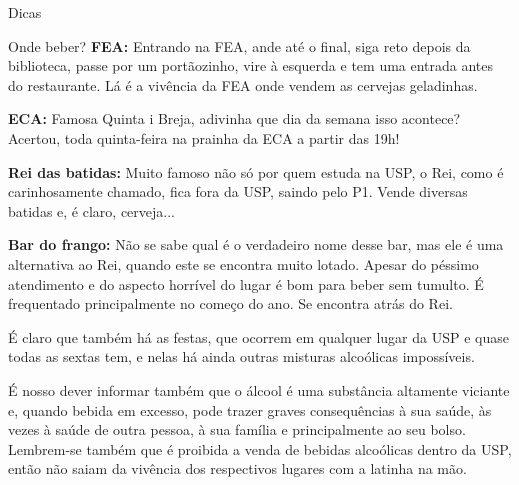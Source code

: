 \begin{secao}{Dicas}
\begin{subsecao}{Onde beber?}
{\bf FEA:} Entrando na FEA, ande até o final, siga reto depois da biblioteca,
passe por um portãozinho, vire à esquerda e tem uma entrada antes do restaurante.
Lá é a vivência da FEA onde vendem as cervejas geladinhas.

{\bf ECA:} Famosa Quinta i Breja, adivinha que dia da semana isso acontece?
Acertou, toda quinta-feira na prainha da ECA a partir das 19h!

{\bf Rei das batidas:} Muito famoso não só por quem estuda na USP, o Rei,
como é carinhosamente chamado, fica fora da USP, saindo pelo P1. Vende
diversas batidas e, é claro, cerveja...

{\bf Bar do frango:} Não se sabe qual é o verdadeiro nome desse bar, mas ele é
uma alternativa ao Rei, quando este se encontra muito lotado. Apesar do péssimo atendimento e do aspecto horrível do lugar é bom para beber sem
tumulto. É frequentado principalmente no começo do ano. Se encontra atrás do
Rei.

É claro que também há as festas, que ocorrem em qualquer lugar da USP e quase todas as sextas tem, e nelas
há ainda outras misturas alcoólicas impossíveis.

É nosso dever informar também que o álcool é uma substância altamente viciante
e, quando bebida em excesso, pode trazer graves consequências à sua saúde, às
vezes à saúde de outra pessoa, à sua família e principalmente ao seu bolso.
Lembrem-se também que é proibida a venda de bebidas alcoólicas dentro da USP, então
não saiam da vivência dos respectivos lugares com a latinha na mão.

\end{subsecao}
\end{secao}
